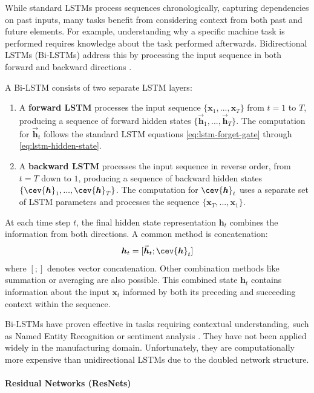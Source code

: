 While standard LSTMs process sequences chronologically, capturing dependencies on past inputs, many tasks benefit from considering context from both past and future elements. For example, understanding why a specific machine task is performed requires knowledge about the task performed afterwards. Bidirectional LSTMs (Bi-LSTMs) address this by processing the input sequence in both forward and backward directions \autocite{schuster1997bidirectional}.

A Bi-LSTM consists of two separate LSTM layers:

\begin{enumerate}
    \item A \textbf{forward LSTM} processes the input sequence \( \{\bm{x}_1, ..., \bm{x}_T\} \) from \( t=1 \) to \( T \), producing a sequence of forward hidden states \( \{\vec{\bm{h}}_1, ..., \vec{\bm{h}}_T\} \). The computation for \( \vec{\bm{h}}_t \) follows the standard LSTM equations \autoref{eq:lstm-forget-gate} through \autoref{eq:lstm-hidden-state}.
    \item A \textbf{backward LSTM} processes the input sequence in reverse order, from \( t=T \) down to \( 1 \), producing a sequence of backward hidden states \( \{\cev{\bm{h}}_1, ..., \cev{\bm{h}}_T\} \). The computation for \( \cev{\bm{h}}_t \) uses a separate set of LSTM parameters and processes the sequence \( \{\bm{x}_T, ..., \bm{x}_1\} \).
\end{enumerate}

At each time step \( t \), the final hidden state representation \( \bm{h}_t \) combines the information from both directions. A common method is concatenation:
\begin{equation}
    \bm{h}_t = [\vec{\bm{h}}_t ; \cev{\bm{h}}_t]
    \label{eq:bilstm_concat}
\end{equation}
where \( [;] \) denotes vector concatenation. Other combination methods like summation or averaging are also possible. This combined state \( \bm{h}_t \) contains information about the input \( \bm{x}_t \) informed by both its preceding and succeeding context within the sequence.

Bi-LSTMs have proven effective in tasks requiring contextual understanding, such as Named Entity Recognition or sentiment analysis \autocite{al2024rnn}. They have not been applied widely in the manufacturing domain. Unfortunately, they are computationally more expensive than unidirectional LSTMs due to the doubled network structure.

\paragraph{\textbf{Residual Networks (ResNets)}}
\label{sec:resnet}

